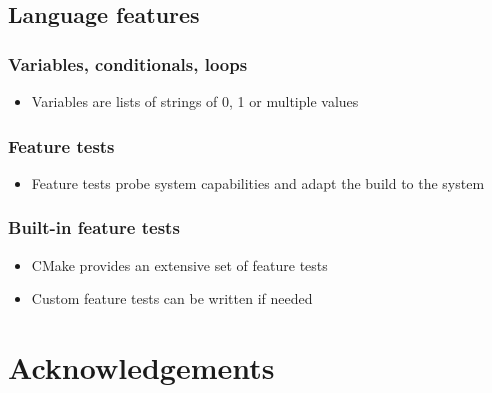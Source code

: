 \documentclass{beamer}
\begin{document}
\subsection{Language features}

\begin{frame}
  \frametitle{Variables, conditionals, loops}

  

  \begin{itemize}
  \item Variables are lists of strings of 0, 1 or multiple values
  \end{itemize}
\end{frame}

\begin{frame}
  \frametitle{Feature tests}

  

  \begin{itemize}
  \item Feature tests probe system capabilities and adapt the build to the system
  \end{itemize}
\end{frame}

\begin{frame}
  \frametitle{Built-in feature tests}

  

  \begin{itemize}
  \item CMake provides an extensive set of feature tests
  \item Custom feature tests can be written if needed
  \end{itemize}
\end{frame}


\appendix

\section[]{Acknowledgements}
\end{document}
